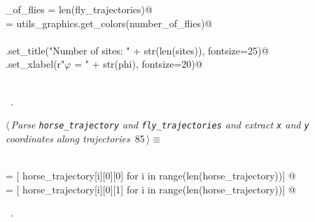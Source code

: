 \documentclass[11.5pt]{report}
\begin{document}
\begin{flushleft}
\begin{minipage}{\linewidth}
\begin{list}{}{}
\mbox{}\verb@number_of_flies = len(fly_trajectories)@\\
\mbox{}\verb@colors = utils_graphics.get_colors(number_of_flies)@\\
\mbox{}\verb@@\\
\mbox{}\verb@ax.set_title("Number of sites: " + str(len(sites)), fontsize=25)@\\
\mbox{}\verb@ax.set_xlabel(r"$\varphi$ = " + str(phi), fontsize=20)@\\
\mbox{}\verb@@\\
\mbox{}\verb@@{\NWsep}
\end{list}
\vspace{-1.5ex}
\footnotesize
\begin{list}{}{\setlength{\itemsep}{-\parsep}\setlength{\itemindent}{-\leftmargin}}
\item \NWtxtMacroRefIn\ .

\item{}
\end{list}
\end{minipage}\vspace{4ex}
\end{flushleft}


\vspace{-0.8cm} \newchunk
\begin{flushleft} \small
\begin{minipage}{\linewidth}\label{scrap136}\raggedright\small
{} $\langle\,${\itshape Parse \verb|horse_trajectory| and \verb|fly_trajectories| and extract \verb|x| and \verb|y| coordinates along trajectories}\nobreak\ {\footnotesize {85}}$\,\rangle\equiv$
\vspace{-1ex}
\begin{list}{}{} \item
\mbox{}\verb@@\\
\mbox{}\verb@xhs = [ horse_trajectory[i][0][0] for i in range(len(horse_trajectory))]    @\\
\mbox{}\verb@yhs = [ horse_trajectory[i][0][1] for i in range(len(horse_trajectory))]    @\\
\mbox{}\verb@@{\NWsep}
\end{list}
\vspace{-1.5ex}
\footnotesize
\begin{list}{}{\setlength{\itemsep}{-\parsep}\setlength{\itemindent}{-\leftmargin}}
\item \NWtxtMacroRefIn\ .

\item{}
\end{list}
\end{minipage}\vspace{4ex}
\end{flushleft}
\end{document}

